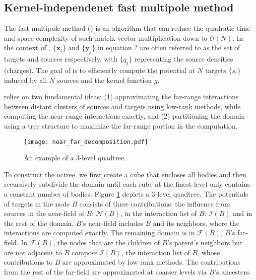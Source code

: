 \subsection{Kernel-independenet fast multipole method}

The fast multipole method (\fmm) is an algorithm that can reduce the quadratic time and space complexity of such matrix-vector multiplication down to $\mathcal{O}(N)$.
In the context of \fmm, $\{\mathbf{x}_i\}$ and $\{\mathbf{y}_j\}$ in equation ? are often referred to as the set of targets and sources respectively, with $\{q_j\}$ representing the source densities (charges).
The goal of \fmm is to efficiently compute the potential at $N$ targets $\{s_i\}$ induced by all $N$ sources and the kernel function $g$.

\fmm relies on two fundamental ideas: (1) approximating the far-range interactions between distant clusters of sources and targets using low-rank methods, while computing the near-range interactions exactly, and (2) partitioning the domain using a tree structure to maximize the far-range portion in the computation.

\begin{figure}
    \centering
    \texttt{[image: near\_far\_decomposition.pdf]}
    \caption{An example of a 3-level quadtree.}
    \label{fig:near_far_decomp}
\end{figure}

To construct the octree, we first create a cube that encloses all bodies and then recursively subdivide the domain until each cube at the finest level only contains a constant number of bodies.
Figure \ref{fig:near_far_decomp} depicts a 3-level quadtree.
The potentials of targets in the node $B$ consists of three contributions: the influence from sources in the near-field of $B$: $\mathcal{N}(B)$, in the interaction list of $B$: $\mathcal{I}(B)$ and in the rest of the domain.
$B$'s near-field includes $B$ and its neighbors, where the interactions are computed exactly.
The remaining domain is in $\mathcal{F}(B)$, $B$'s far-field.
In $\mathcal{F}(B)$, the nodes that are the children of $B$'s parent's neighbors but are not adjacent to $B$ compose $\mathcal{I}(B)$, the interaction list of $B$, whose contributions to $B$ are approximated by low-rank methods.
The contributions from the rest of the far-field are approximated at coarser levels via $B$'s ancesters.

